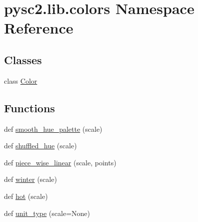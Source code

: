 \hypertarget{namespacepysc2_1_1lib_1_1colors}{}\section{pysc2.\+lib.\+colors Namespace Reference}
\label{namespacepysc2_1_1lib_1_1colors}
\subsection*{Classes}
\begin{DoxyCompactItemize}
\item 
class \mbox{\hyperlink{classpysc2_1_1lib_1_1colors_1_1_color}{Color}}
\end{DoxyCompactItemize}
\subsection*{Functions}
\begin{DoxyCompactItemize}
\item 
def \mbox{\hyperlink{namespacepysc2_1_1lib_1_1colors_ae002858f8d783860fb6fd2cb780144c4}{smooth\+\_\+hue\+\_\+palette}} (scale)
\item 
def \mbox{\hyperlink{namespacepysc2_1_1lib_1_1colors_a16abe444569e0f4247136c250a48e6a3}{shuffled\+\_\+hue}} (scale)
\item 
def \mbox{\hyperlink{namespacepysc2_1_1lib_1_1colors_ab4af018d663e7de0ef7b62c729fb81a2}{piece\+\_\+wise\+\_\+linear}} (scale, points)
\item 
def \mbox{\hyperlink{namespacepysc2_1_1lib_1_1colors_ac3ee96fe4f9d521165e949a436b76968}{winter}} (scale)
\item 
def \mbox{\hyperlink{namespacepysc2_1_1lib_1_1colors_a8f4a49eb3a5ca2bf529362e14e3d711c}{hot}} (scale)
\item 
def \mbox{\hyperlink{namespacepysc2_1_1lib_1_1colors_ae0af5a08f5570f8eb5b2b66fcf26ea15}{unit\+\_\+type}} (scale=None)
\end{DoxyCompactItemize}
